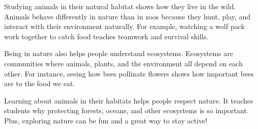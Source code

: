 \documentclass[12pt]{article}
\begin{document}
\vspace{1em}
\begin{tcolorbox}[colframe=black!60, colback=white, 
coltitle=black, colbacktitle=black!15, fonttitle=\bfseries\Large, 
title=Source 2: Learning About Animals in Their Natural Habitat, halign title=center, left=10pt, right=10pt, top=10pt, bottom=15pt]
Studying animals in their natural habitat shows how they live in the wild. Animals behave differently in nature than in zoos because they hunt, play, and interact with their environment naturally. For example, watching a wolf pack work together to catch food teaches teamwork and survival skills.

Being in nature also helps people understand ecosystems. Ecosystems are communities where animals, plants, and the environment all depend on each other. For instance, seeing how bees pollinate flowers shows how important bees are to the food we eat.

Learning about animals in their habitats helps people respect nature. It teaches students why protecting forests, oceans, and other ecosystems is so important. Plus, exploring nature can be fun and a great way to stay active!
\end{tcolorbox}

\vspace{1em}
\end{document}
